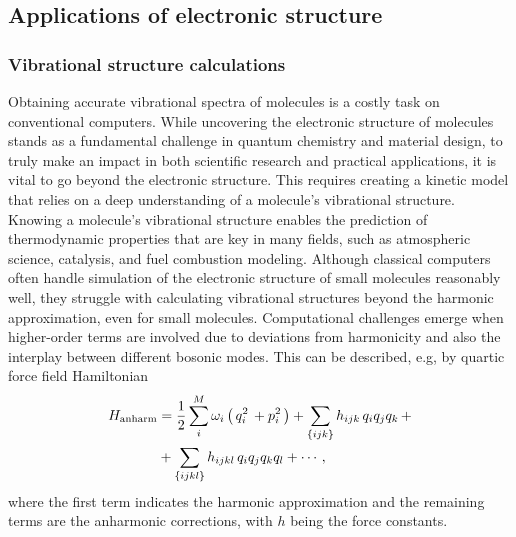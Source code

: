 \subsection{Applications of electronic structure}

\subsubsection{Vibrational structure calculations}

Obtaining accurate vibrational spectra of molecules is a costly task on conventional computers. While uncovering the electronic structure of molecules stands as a fundamental challenge in quantum chemistry and material design, to truly make an impact in both scientific research and practical applications, it is vital to go beyond the electronic structure. This requires creating a kinetic model that relies on a deep understanding of a molecule's vibrational structure.  Knowing a molecule's vibrational structure enables the prediction of thermodynamic properties that are key in many fields, such as atmospheric science, catalysis, and fuel combustion modeling.  Although classical computers often handle simulation of the electronic structure of small molecules reasonably well, they struggle with calculating vibrational structures beyond the harmonic approximation, even for small molecules. Computational challenges emerge when higher-order terms are involved due to deviations from harmonicity and also the interplay between different bosonic modes. This can be described, e.g, by quartic force field Hamiltonian~\cite{ollitraultCS2020}
\begin{equation}
\begin{split}
\label{eq:vibrational}
H_{\rm{anharm}}&=\frac{1}{2} \sum_i^M \omega_i\left(\, q_i^2\, + p_i^2\, \right) +\sum_{\{ijk\}} h_{ijk}\, q_iq_jq_k \, +
\nonumber \\
&+  \sum_{\{ijk l \}} h_{ijkl}\, q_iq_jq_k q_l +\cdots \, , 
\end{split}
\end{equation}
where the first term  indicates the harmonic approximation and the remaining terms are the 
anharmonic corrections, with $h$ being the force constants.
%

